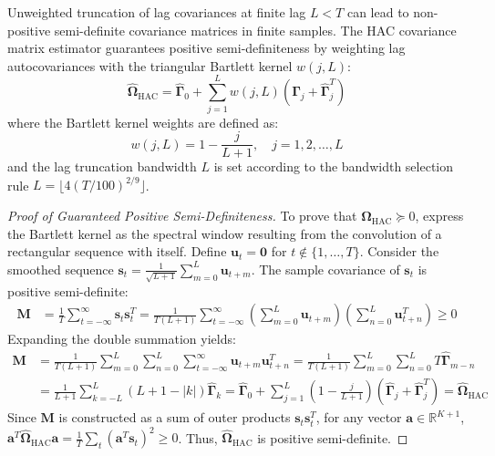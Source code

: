 Unweighted truncation of lag covariances at finite lag $L < T$ can lead to non-positive semi-definite covariance matrices in finite samples. The \citet{newey1987simple} HAC covariance matrix estimator guarantees positive semi-definiteness by weighting lag autocovariances with the triangular Bartlett kernel $w(j,L)$:
\begin{equation}
\widehat{\mathbf{\Omega}}_{\text{HAC}} = \hat{\mathbf{\Gamma}}_0 + \sum_{j=1}^L w(j, L) \left( \hat{\mathbf{\Gamma}}_j + \hat{\mathbf{\Gamma}}_j^T \right)
\label{eq:ch4_newey_west_omega}
\end{equation}
where the Bartlett kernel weights are defined as:
\begin{equation}
w(j, L) = 1 - \frac{j}{L+1}, \quad j = 1, 2, \dots, L
\label{eq:ch4_bartlett_kernel}
\end{equation}
and the lag truncation bandwidth $L$ is set according to the bandwidth selection rule $L = \lfloor 4 (T / 100)^{2/9} \rfloor$.

\begin{proof}[Proof of Guaranteed Positive Semi-Definiteness]
To prove that $\widehat{\mathbf{\Omega}}_{\text{HAC}} \succeq 0$, express the Bartlett kernel as the spectral window resulting from the convolution of a rectangular sequence with itself. Define $\mathbf{u}_t = \mathbf{0}$ for $t \notin \{1, \dots, T\}$. Consider the smoothed sequence $\mathbf{s}_t = \frac{1}{\sqrt{L+1}} \sum_{m=0}^L \mathbf{u}_{t+m}$. The sample covariance of $\mathbf{s}_t$ is positive semi-definite:
\begin{align}
\mathbf{M} &= \frac{1}{T} \sum_{t=-\infty}^{\infty} \mathbf{s}_t \mathbf{s}_t^T = \frac{1}{T(L+1)} \sum_{t=-\infty}^{\infty} \left( \sum_{m=0}^L \mathbf{u}_{t+m} \right) \left( \sum_{n=0}^L \mathbf{u}_{t+n}^T \right) \ge 0
\end{align}
Expanding the double summation yields:
\begin{align}
\mathbf{M} &= \frac{1}{T(L+1)} \sum_{m=0}^L \sum_{n=0}^L \sum_{t=-\infty}^{\infty} \mathbf{u}_{t+m} \mathbf{u}_{t+n}^T = \frac{1}{T(L+1)} \sum_{m=0}^L \sum_{n=0}^L T \hat{\mathbf{\Gamma}}_{m-n} \\
&= \frac{1}{L+1} \sum_{k=-L}^L (L + 1 - |k|) \hat{\mathbf{\Gamma}}_k = \hat{\mathbf{\Gamma}}_0 + \sum_{j=1}^L \left( 1 - \frac{j}{L+1} \right) \left( \hat{\mathbf{\Gamma}}_j + \hat{\mathbf{\Gamma}}_j^T \right) = \widehat{\mathbf{\Omega}}_{\text{HAC}}
\end{align}
Since $\mathbf{M}$ is constructed as a sum of outer products $\mathbf{s}_t \mathbf{s}_t^T$, for any vector $\mathbf{a} \in \mathbb{R}^{K+1}$, $\mathbf{a}^T \widehat{\mathbf{\Omega}}_{\text{HAC}} \mathbf{a} = \frac{1}{T} \sum_t (\mathbf{a}^T \mathbf{s}_t)^2 \ge 0$. Thus, $\widehat{\mathbf{\Omega}}_{\text{HAC}}$ is positive semi-definite.
\end{proof}

